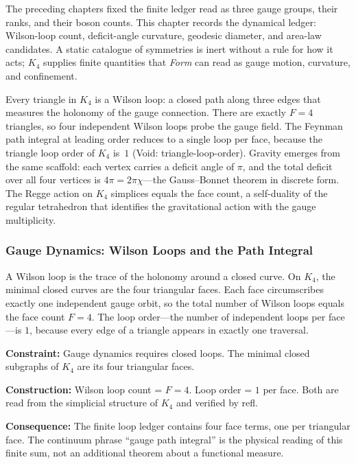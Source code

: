 \documentclass[11pt,a4paper]{book}
\def\texttt#1{#1}%
\begin{document}
The preceding chapters fixed the finite ledger read as three gauge groups,
their ranks, and their boson counts.  This chapter records the dynamical
ledger: Wilson-loop count, deficit-angle curvature, geodesic
diameter, and area-law candidates.  A static catalogue of symmetries is inert
without a rule for how it acts; $K_4$ supplies finite quantities that \textit{Form}
can read as gauge motion, curvature, and confinement.

Every triangle in $K_4$ is a Wilson loop: a closed path along three edges
that measures the holonomy of the gauge connection.  There are exactly
$F = 4$ triangles, so four independent Wilson loops probe the gauge field.
The Feynman path integral at leading order reduces to a single loop per face,
because the triangle loop order of $K_4$ is~$1$ (Void: \texttt{triangle-loop-order}).
Gravity emerges from the same scaffold: each vertex carries a deficit angle
of $\pi$, and the total deficit over all four vertices is $4\pi = 2\pi \chi$---the
Gauss--Bonnet theorem in discrete form.  The Regge action on $K_4$ simplices
equals the face count, a self-duality of the regular tetrahedron that identifies
the gravitational action with the gauge multiplicity.

\subsubsection*{Gauge Dynamics: Wilson Loops and the Path Integral}

A Wilson loop is the trace of the holonomy around a closed curve.  On $K_4$,
the minimal closed curves are the four triangular faces.  Each face circumscribes
exactly one independent gauge orbit, so the total number of Wilson loops equals
the face count $F = 4$.  The loop order---the number of independent loops per
face---is $1$, because every edge of a triangle appears in exactly one traversal.

\textbf{Constraint:}
Gauge dynamics requires closed loops.  The minimal closed subgraphs of $K_4$
are its four triangular faces.

\textbf{Construction:}
Wilson loop count = $F = 4$.  Loop order = $1$ per face.  Both are read from
the simplicial structure of $K_4$ and verified by \texttt{refl}.

\textbf{Consequence:}
The finite loop ledger contains four face terms, one per triangular face.  The
continuum phrase ``gauge path integral'' is the physical reading of this finite
sum, not an additional theorem about a functional measure.
\end{document}
